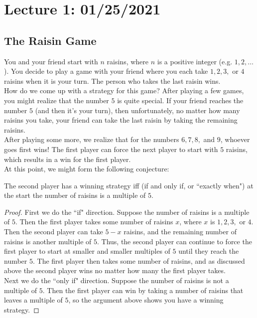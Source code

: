 \section{Lecture 1: 01/25/2021}

\subsection{The Raisin Game}

You and your friend start with $n$ raisins, where $n$ is a positive integer (e.g. $1, 2, \dots$). You decide to play a game with your friend where you each take $1, 2, 3,$ or $4$ raisins when it is your turn. The person who takes the last raisin wins. \\

How do we come up with a strategy for this game? After playing a few games, you might realize that the number $5$ is quite special. If your friend reaches the number $5$ (and then it's your turn), then unfortunately, no matter how many raisins you take, your friend can take the last raisin by taking the remaining raisins.\\

After playing some more, we realize that for the numbers $6, 7, 8,$ and $9$, whoever goes first wins! The first player can force the next player to start with $5$ raisins, which results in a win for the first player.\\

At this point, we might form the following conjecture:

\begin{conjecture}
The second player has a winning strategy iff (if and only if, or ``exactly when") at the start the number of raisins is a multiple of $5$.
\end{conjecture}

\begin{proof}
First we do the ``if" direction. Suppose the number of raisins is a multiple of $5$. Then the first player takes some number of raisins $x$, where $x$ is $1, 2, 3,$ or $4$. Then the second player can take $5-x$ raisins, and the remaining number of raisins is another multiple of $5$. Thus, the second player can continue to force the first player to start at smaller and smaller multiples of $5$ until they reach the number $5$. The first player then takes some number of raisins, and as discussed above the second player wins no matter how many the first player takes.\\

Next we do the ``only if" direction. Suppose the number of raisins is not a multiple of $5$. Then the first player can win by taking a number of raisins that leaves a multiple of $5$, so the argument above shows you have a winning strategy.
\end{proof}

